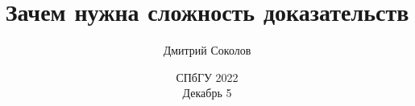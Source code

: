 

\titlegraphic{
    
}


\title[Сложность доказательств]{
    Зачем нужна сложность доказательств
}

\author[Соколов Д.]{
    Дмитрий Соколов
}  


\date{СПбГУ 2022\\ Декабрь 5}





    \maketitle

    
    
    
    
    

